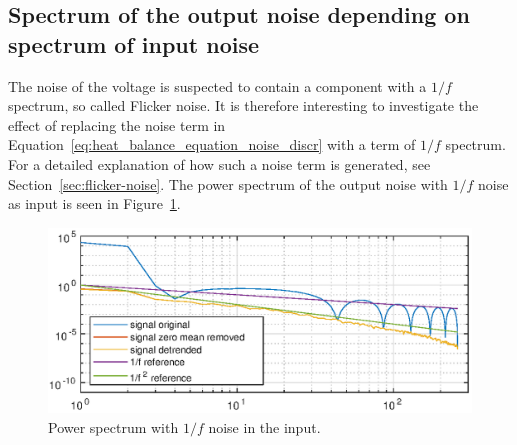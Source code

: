 \subsection{Spectrum of the output noise depending on spectrum of input noise}
The noise of the voltage is suspected to contain a component with a
$1/f$ spectrum, so called Flicker noise. It is therefore interesting
to investigate the effect of replacing the noise term in
Equation~\eqref{eq:heat_balance_equation_noise_discr} with a term of $1/f$
spectrum. For a detailed explanation of how such a noise term is
generated, see Section~\ref{sec:flicker-noise}. The power spectrum
of the output noise with $1/f$ noise as input is seen in
Figure~\ref{fig:power_spectrum_pink}.

\begin{figure}[H]
\includegraphics[scale=0.9]{gfx/spectrum_pink_noise.eps}
\caption{Power spectrum with $1/f$ noise in the input.}
\label{fig:power_spectrum_pink}
\end{figure}


